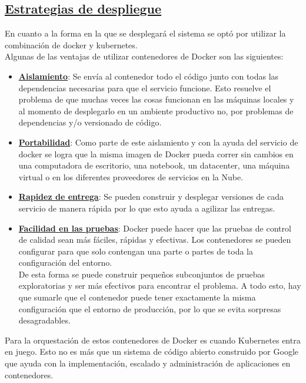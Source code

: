 \subsection*{\underline{Estrategias de despliegue}}
En cuanto a la forma en la que se desplegará el sistema se optó por utilizar la combinación de docker y kubernetes.\\
Algunas de las ventajas de utilizar contenedores de Docker son las siguientes:

\begin{itemize}
	\item \textbf{\underline{Aislamiento}}: Se envía al contenedor todo el código  junto con todas las dependencias necesarias para que el servicio funcione. Esto resuelve el problema de que muchas veces las cosas funcionan en las máquinas locales y al momento de desplegarlo en un ambiente productivo no, por problemas de dependencias y/o versionado de código.
	\item \textbf{\underline{Portabilidad}}: Como parte de este aislamiento y con la ayuda del servicio de docker se logra que la misma imagen de Docker pueda correr sin cambios en una computadora de escritorio, una notebook, un datacenter, una máquina virtual o en los diferentes proveedores de servicios en la Nube.
	\item \textbf{\underline{Rapidez de entrega}}: Se pueden construir y desplegar versiones de cada servicio de manera rápida por lo que esto ayuda a agilizar las entregas. 
	\item \textbf{\underline{Facilidad en las pruebas}}: Docker puede hacer que las pruebas de control de calidad sean más fáciles, rápidas y efectivas. Los contenedores se pueden configurar para que solo contengan una parte o partes de toda la configuración del entorno. \\
De esta forma se puede construir pequeños subconjuntos de pruebas exploratorias y ser más efectivos para encontrar el problema. A todo esto, hay que sumarle que el contenedor puede tener exactamente la misma configuración que el entorno de producción, por lo que se evita sorpresas desagradables.\\
\end{itemize}

Para la orquestación de estos contenedores de Docker es cuando Kubernetes entra en juego. Esto no es más que un sistema de código abierto construido por Google que ayuda con la implementación, escalado y administración de aplicaciones en contenedores. \\


